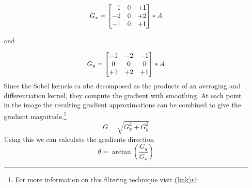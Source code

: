 \[\centering
G_x = \begin{bmatrix} 
    -1&0&+1\\
    -2&0&+2\\
    -1&0&+1\\
    \end{bmatrix}
    * A
\]
\begin{center}
    and
\end{center}
\[ \centering
 G_y = \begin{bmatrix} 
    -1&-2&-1\\
    0&0&0\\
    +1&+2&+1\\
    \end{bmatrix}
    * A
\]
Since the Sobel kernels ca nbe decomposed as the products of an averaging and differentiation kernel, they compute the gradient with smoothing. At each point in the image the resulting gradient approximations can be combined to give the gradient magnitude.\footnote{For more information on this filtering technique visit \href{https://www.tutorialspoint.com/dip/sobel_operator.htm}{(link)}}
\[
G = \sqrt{G_x^2 + G_y^2}
\]
Using this we can calculate the gradients direction
\[
\theta = \arctan(\frac{G_y}{G_x})
\]
